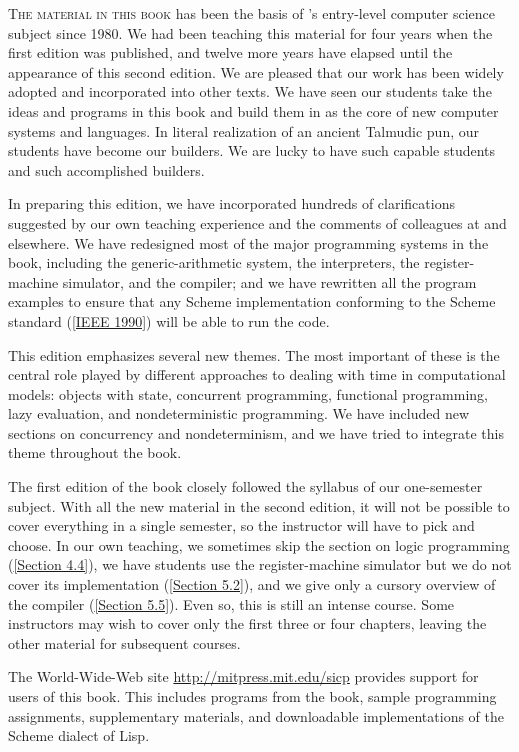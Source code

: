 \label{Preface}

\vspace{2em}

\lettrine{T}{he material in this book} has been the basis of ’s entry-level computer science subject since 1980.
We had been teaching this material for four years when the first edition was published, and twelve more years have elapsed until the appearance of this second edition.
We are pleased that our work has been widely adopted and incorporated into other texts.
We have seen our students take the ideas and programs in this book and build them in as the core of new computer systems and languages.
In literal realization of an ancient Talmudic pun, our students have become our builders.
We are lucky to have such capable students and such accomplished builders.

In preparing this edition, we have incorporated hundreds of clarifications suggested by our own teaching experience and the comments of colleagues at  and elsewhere.
We have redesigned most of the major programming systems in the book, including the generic-arithmetic system, the interpreters, the register-machine simulator, and the compiler;
and we have rewritten all the program examples to ensure that any Scheme implementation conforming to the  Scheme standard (\cref{IEEE 1990}) will be able to run the code.

This edition emphasizes several new themes.
The most important of these is the central role played by different approaches to dealing with time in computational models:
objects with state, concurrent programming, functional programming, lazy evaluation, and nondeterministic programming.
We have included new sections on concurrency and nondeterminism, and we have tried to integrate this theme throughout the book.

The first edition of the book closely followed the syllabus of our
 one-semester subject.
With all the new material in the second edition, it will not be possible to cover everything in a single semester, so the instructor will have to pick and choose.
In our own teaching, we sometimes skip the section on logic programming (\cref{Section 4.4}), we have students use the register-machine simulator but we do not cover its implementation (\cref{Section 5.2}), and we give only a cursory overview of the compiler (\cref{Section 5.5}).
Even so, this is still an intense course.
Some instructors may wish to cover only the first three or four chapters, leaving the other material for subsequent courses.

The World-Wide-Web site \href{http://mitpress.mit.edu/sicp}{http://mitpress.mit.edu/sicp} provides support for users of this book.
This includes programs from the book, sample programming assignments, supplementary materials, and downloadable implementations of the Scheme dialect of Lisp.
